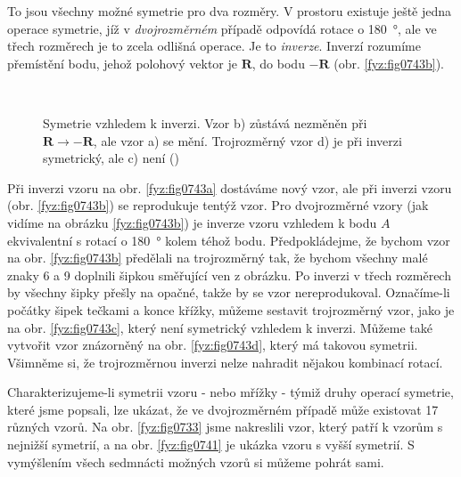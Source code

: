     To jsou všechny možné symetrie pro dva rozměry. V prostoru existuje ještě jedna operace 
    symetrie, jíž v \emph{dvojrozměrném} případě odpovídá rotace o \SI{180}{\degree}, ale ve třech 
    rozměrech je to zcela odlišná operace. Je to \emph{inverze}. Inverzí rozumíme přemístění bodu, 
    jehož polohový vektor je \(\bm{R}\), do bodu \(\bm{-R}\) (obr. \ref{fyz:fig0743b}). 

    \begin{figure}[ht!]   %
      \centering
                    \\
      \caption{Symetrie vzhledem k inverzi. Vzor b) zůstává nezměněn při \(\bm{R} \rightarrow 
               \bm{-R}\), ale vzor a) se mění. Trojrozměrný vzor d) je při inverzi symetrický, ale 
               c) není
               (\cite[s.~551]{Feynman02})}
      \label{fyz:fig0743}
    \end{figure}

    Při inverzi vzoru na obr. \ref{fyz:fig0743a} dostáváme nový vzor, ale při inverzi vzoru (obr. 
    \ref{fyz:fig0743b}) se reprodukuje tentýž vzor. Pro dvojrozměrné vzory (jak vidíme na obrázku 
    \ref{fyz:fig0743b}) je inverze vzoru vzhledem k bodu \(A\) ekvivalentní s rotací o 
    \SI{180}{\degree} kolem téhož bodu. Předpokládejme, že bychom vzor na obr. \ref{fyz:fig0743b} 
    předělali na trojrozměrný tak, že bychom všechny malé znaky \num{6} a \num{9} doplnili šipkou 
    směřující ven z obrázku. Po inverzi v třech rozměrech by všechny šipky přešly na opačné, takže 
    by se vzor nereprodukoval. Označíme-li počátky šipek tečkami a konce křížky, můžeme sestavit 
    trojrozměrný vzor, jako je na obr. \ref{fyz:fig0743c}, který není symetrický vzhledem k inverzi. 
    Můžeme také vytvořit vzor znázorněný na obr. \ref{fyz:fig0743d}, který má takovou symetrii. 
    Všimněme si, že trojrozměrnou inverzi nelze nahradit nějakou kombinací rotací.

    Charakterizujeme-li symetrii vzoru - nebo mřížky - týmiž druhy operací symetrie, které jsme 
    popsali, lze ukázat, že ve dvojrozměrném případě může existovat \num{17} různých vzorů. Na obr. 
    \ref{fyz:fig0733} jsme nakreslili vzor, který patří k vzorům s nejnižší symetrií, a na obr. 
    \ref{fyz:fig0741} je ukázka vzoru s vyšší symetrií. S vymýšlením všech sedmnácti možných vzorů 
    si můžeme pohrát sami.
    

